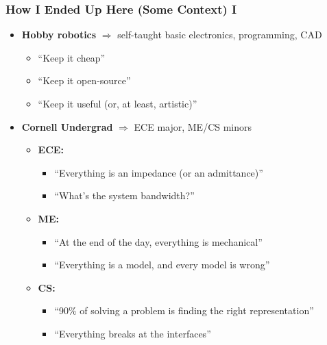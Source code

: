 \documentclass[aspectratio=169]{beamer}
\begin{document}
	
		\begin{frame}
			\frametitle{How I Ended Up Here (Some Context) I}
			\vspace{-0.5em}
			\begin{itemize}
				\item \textbf{Hobby robotics} $\Rightarrow$ self-taught basic electronics, programming, CAD\pause
					\begin{itemize}
						\item ``Keep it cheap''
						\item ``Keep it open-source''
						\item ``Keep it useful (or, at least, artistic)''
					\end{itemize}\pause
				\vspace{0.5em}
				\item \textbf{Cornell Undergrad} $\Rightarrow$ ECE major, ME/CS minors\pause
					\begin{itemize}
						\item \textbf{ECE:}
							\begin{itemize}
								\item ``Everything is an impedance (or an admittance)''
								\item ``What's the system bandwidth?''
							\end{itemize}
						\item \textbf{ME:}\pause
							\begin{itemize}
								\item ``At the end of the day, everything is mechanical''
								\item ``Everything is a model, and every model is wrong''
							\end{itemize}\pause
						\item \textbf{CS:} 
						\begin{itemize}
							\item ``90\% of solving a problem is finding the right representation''
							\item ``Everything breaks at the interfaces''
						\end{itemize}
					\end{itemize}
			\end{itemize}
		\end{frame}
	
\end{document}
